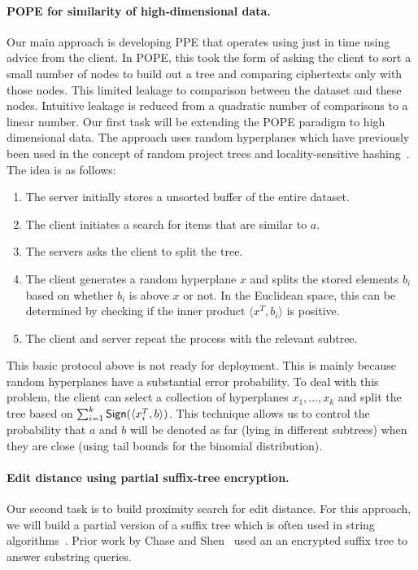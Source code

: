 \paragraph{POPE for similarity of high-dimensional data.}
Our main approach is developing PPE that operates using just in time using
advice from the client.  In POPE, this took the form of asking the client to
sort a small number of nodes to build out a tree and comparing ciphertexts only
with those nodes.  This limited leakage to comparison between the dataset and
these nodes.  Intuitive leakage is reduced from a quadratic number of
comparisons to a linear number.  Our first task will be extending the POPE
paradigm to high dimensional data.  The approach uses random hyperplanes which
have previously been used in the concept of random project trees and
locality-sensitive hashing~\cite{STOC:DasFre08,charikar2002similarity}.  The
idea is as follows:

\begin{enumerate}\setlength\itemsep{0em}
\item The server initially stores a unsorted buffer of the entire dataset.
\item The client initiates a search for items that are similar to $a$.
\item The servers asks the client to split the tree.
\item The client generates a random hyperplane $x$ and splits 
  the stored elements $b_i$ based on whether $b_i$ is above $x$ or not. In the Euclidean
    space, this can be determined by checking if the inner product
    $\langle x^T,b_i \rangle$ is positive. 
\item The client and server repeat the process with the relevant subtree.
\end{enumerate} 
%
This basic protocol above is not ready for deployment. This is mainly because
random hyperplanes have a substantial error probability.  To deal with this
problem, the client can select a collection of hyperplanes $x_1,..., x_k$ and
split the tree based on $\sum_{i=1}^k \mathsf{Sign}( \langle x_i^T, b \rangle )$.  This
technique allows us to control the probability that $a$ and $b$ will be denoted
as far (lying in different subtrees) when they are close (using tail bounds for
the binomial distribution). %

\paragraph{Edit distance using partial suffix-tree encryption.}
Our second task is to build proximity search for edit distance.  For this
approach, we will build a partial version of a suffix tree which is often used
in string algorithms~\cite{mccreight1976space}.  Prior work by Chase and
Shen~\cite{chase2015substring} used an an encrypted suffix tree to answer
substring queries.

